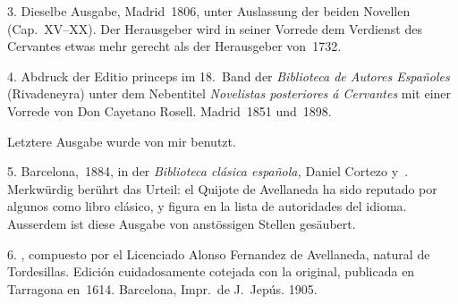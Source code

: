 {3. Dieselbe Ausgabe, Madrid~1806, unter Auslassung der beiden Novellen
(Cap.~XV--XX). Der Herausgeber wird in seiner Vorrede dem Verdienst des
Cervantes etwas mehr gerecht als der Herausgeber von~1732.

4. Abdruck der Editio princeps im 18.~Band der {\it\spanish Biblioteca de Autores
Españoles} (Rivadeneyra) unter dem Nebentitel {\it\spanish Novelistas posteriores á Cervantes}
mit einer Vorrede von Don Cayetano Rosell. Madrid~1851 und~1898.

Letztere Ausgabe wurde von mir benutzt.

5. Barcelona,~1884, in der {\it\spanish Biblioteca clásica española,} Daniel Cortezo y~\Ca.
Merkwürdig berührt das Urteil: {\itquoted\spanish el Quijote de Avellaneda ha sido reputado
por algunos como libro clásico, y figura en la lista de autoridades del idioma.}
Ausserdem ist diese Ausgabe von anstössigen Stellen gesäubert.

6. {, compuesto por el Licenciado Alonso Fernandez
de Avellaneda, natural de Tordesillas. Edición cuidadosamente cotejada con la
original, publicada en Tarragona en~1614. Barcelona, Impr.~de J.~Jepús. 1905.}
}

\def\pivni{
1. {\french {\emph Nouvelles avantures de l'admirable Don Quichotte de
la Manche,} composées Par le Licencié Alonso Fernandez de Avellaneda: Et
traduites de l'Espagnol en François pour la première fois. Paris, Chez la Veuve
de Claude Barbin, 1704. Avec Privilège du Roy. 2~vols en \duodecimo.
ferner Amsterdam~1705 und London~1707 (Par M.~L.~S.), Bruxelles~1707 (nur bei Claretie
a.~a.~O.\ S.~430), Paris~1716, David~1741 (citiert bei Quérard, {\it La France littéraire}).}

Diese Bearbeitung, die von Lesage herrührt, war bereits~1702 vollendet
(Gutachten von Fontenelle 25.~Oct.~1702). Das Privileg ging von Gabriel Martin
auf die Witwe Claude Barbin über, sodass sich der Druck um zwei Jahre verzögerte.
Näheres später S.~47~ff.

2. {\french {\emph Le Don Quichotte de Fernandez Avellaneda,} traduit de
l'espagnol et annoté par A.~Germond de Lavigne. Paris, Didier,~1853.}

Die Einleitung dieser Übersetzung war im vorhergehenden Jahre bereits
gesondert erschienen:

{\french {\it Les deux Don Quichotte,} étude critique sur l'œuvre de Fernandez Avellaneda
faisant suite à la première partie du Don Quichotte de Cervantes. P.~1852.}
}

